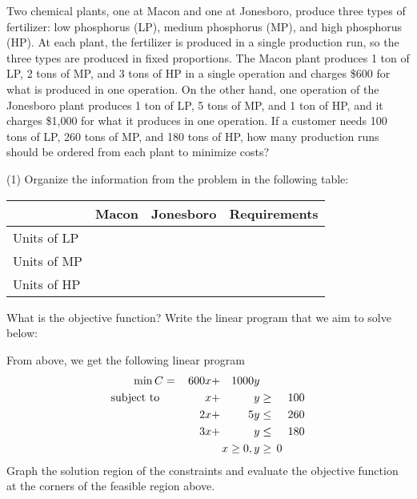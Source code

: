 \documentclass[../mathNotesPreamble]{subfiles}
\begin{document}
  \begin{ex*}
    Two chemical plants, one at Macon and one at Jonesboro, produce three types of fertilizer: low phosphorus (LP), medium phosphorus (MP), and high phosphorus (HP). At each plant, the fertilizer is produced in a single production run, so the three types are produced in fixed proportions. The Macon plant produces 1 ton of LP, 2 tons of MP, and 3 tons of HP in a single operation and charges \$600 for what is produced in one operation. On the other hand, one operation of the Jonesboro plant produces 1 ton of LP, 5 tons of MP, and 1 ton of HP, and it charges \$1,000 for what it produces in one operation. If a customer needs 100 tons of LP, 260 tons of MP, and 180 tons of HP, how many production runs should be ordered from each plant to minimize costs?
  \end{ex*}
  \begin{extasks}[after-item-skip=3\baselineskip](1)
    \task Organize the information from the problem in the following table:

      \begin{tabularx}{0.8\linewidth}{@{}*{4}{X}@{}}\toprule
        & Macon& Jonesboro& Requirements\\\midrule
        Units of LP \\
        Units of MP \\
        Units of HP \\\bottomrule
      \end{tabularx}
    \task What is the objective function?
    \task Write the linear program that we aim to solve below:
  \end{extasks}
  \pagebreak
  
  \begin{ex*}
    From above, we get the following linear program
    \begin{alignat*}{4}
      \min C&=&\,600x&+&1000y\\
      \textnormal{subject to }&& x&+&y&\geq& 100\\
        &&2x&+&5y&\leq &\,260\\
        &&3x&+&y&\leq& 180\\
        &&&&\mathllap{x\geq 0}, y&\geq\mathrlap{\,0}& 
    \end{alignat*}
    Graph the solution region of the constraints and evaluate the objective function at the corners of the feasible region above.
  \end{ex*}
\end{document}
